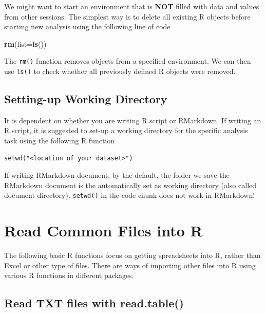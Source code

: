 \documentclass[
]{book}
\newenvironment{Shaded}{\begin{snugshade}}{\end{snugshade}}
\newcommand{\AttributeTok}[1]{\textcolor[rgb]{0.13,0.29,0.53}{#1}}
\newcommand{\FunctionTok}[1]{\textcolor[rgb]{0.13,0.29,0.53}{\textbf{#1}}}
\newcommand{\NormalTok}[1]{#1}
\begin{document}
We might want to start an environment that is \textbf{NOT} filled with data and values from other sessions. The simplest way is to delete all existing R objects before starting new analysis using the following line of code

\begin{Shaded}
\begin{Highlighting}[]
\FunctionTok{rm}\NormalTok{(}\AttributeTok{list=}\FunctionTok{ls}\NormalTok{())}
\end{Highlighting}
\end{Shaded}

The \texttt{rm()} function removes objects from a specified environment. We can then use \texttt{ls()} to check whether all previously defined R objects were removed.

\hypertarget{setting-up-working-directory}{%
\subsection{Setting-up Working Directory}\label{setting-up-working-directory}}

It is dependent on whether you are writing R script or RMarkdown. If writing an R script, it is suggested to set-up a working directory for the specific analysis task using the following R function

\begin{verbatim}
setwd("<location of your dataset>")
\end{verbatim}

If writing RMarkdown document, by the default, the folder we save the RMarkdown document is the automatically set as working directory (also called document directory). \texttt{setwd()} in the code chunk does not work in RMarkdown!

\hypertarget{read-common-files-into-r}{%
\section{Read Common Files into R}\label{read-common-files-into-r}}

The following basic R functions focus on getting spreadsheets into R, rather than Excel or other type of files. There are ways of importing other files into R using various R functions in different packages.

\hypertarget{read-txt-files-with-read.table}{%
\subsection{Read TXT files with read.table()}\label{read-txt-files-with-read.table}}
\end{document}
